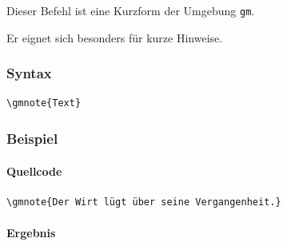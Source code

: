 Dieser Befehl ist eine Kurzform der Umgebung \verb|gm|.

Er eignet sich besonders für kurze Hinweise.

\subsubsection*{Syntax}

\begin{Verbatim}
\gmnote{Text}
\end{Verbatim}

\subsubsection*{Beispiel}

\paragraph{Quellcode}

\begin{Verbatim}
\gmnote{Der Wirt lügt über seine Vergangenheit.}
\end{Verbatim}

\paragraph{Ergebnis}

